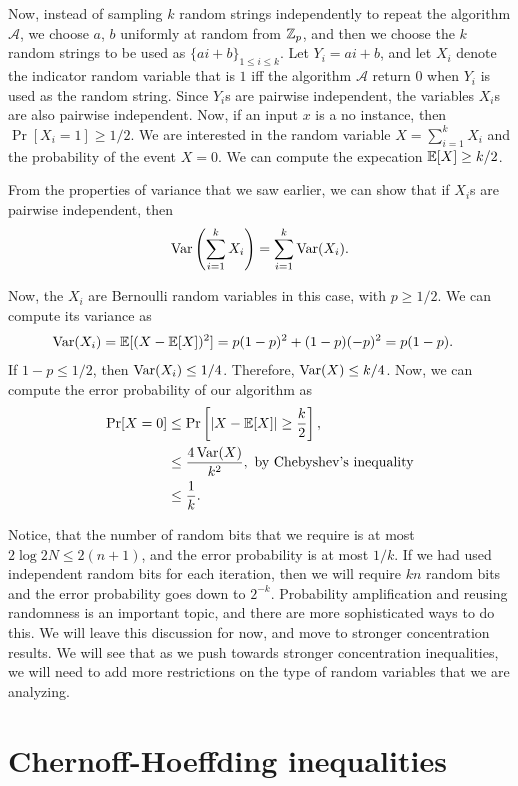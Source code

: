 Now, instead of sampling $k$ random strings independently to repeat the algorithm $\mathcal{A}$, we choose $a$, $b$ uniformly at random from $\mathbb{Z}_p$, and then we choose the $k$ random strings to be used as $\{ai+b\}_{1\leq i \leq k}$. Let $Y_i = ai +b$, and let $X_i$ denote the indicator random variable that is $1$ iff the algorithm $\mathcal{A}$ return $0$ when $Y_i$ is used as the random string. Since $Y_i$s are pairwise independent, the variables $X_i$s are also pairwise independent. Now, if an input $x$ is a no instance, then $\Pr[X_i = 1] \geq 1/2$. We are interested in the random variable $X = \sum_{i=1}^k X_i$ and the probability of the event $X = 0$. We can compute the expecation $\mathbb{E}[X] \geq k/2$.

From the properties of variance that we saw earlier, we can show that if $X_i$s are pairwise independent, then
\begin{align*}
	\operatorname{Var}\left(\sum_{i=1}^k X_i \right) = \sum_{i=1}^k \operatorname{Var}(X_i).
\end{align*}

Now, the $X_i$ are Bernoulli random variables in this case, with $p \geq 1/2$. We can compute its variance as
\begin{align*}
	\operatorname{Var}(X_i) &= \mathbb{E}[(X-\mathbb{E}[X])^2] = p(1-p)^2 + (1-p)(-p)^2 = p(1-p).
\end{align*}
If $1-p \leq 1/2$, then $\operatorname{Var}(X_i) \leq 1/4$. Therefore, $\operatorname{Var}(X) \leq k/4$. Now, we can compute the error probability of our algorithm as 
\begin{align*}
	\Pr[X = 0] &\leq \Pr\left[|X - \mathbb{E}[X]| \geq \frac{k}{2}\right], \\
	&\leq \frac{4\operatorname{Var}(X)}{k^2}, \text{ by Chebyshev's inequality}\\
	&\leq \frac{1}{k}.
\end{align*}

Notice, that the number of random bits that we require is at most $2\log 2N \leq 2(n+1)$, and the error probability is at most $1/k$. If we had used independent random bits for each iteration, then we will require $kn$ random bits and the error probability goes down to $2^{-k}$. Probability amplification and reusing randomness is an important topic, and there are more sophisticated ways to do this. We will leave this discussion for now, and move to stronger concentration results. We will see that as we push towards stronger concentration inequalities, we will need to add more restrictions on the type of random variables that we are analyzing.

\section{Chernoff-Hoeffding inequalities}

